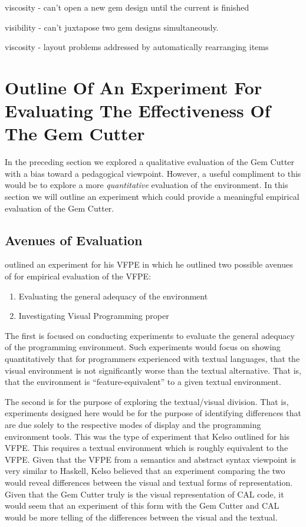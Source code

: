 viscosity - can't open a new gem design until the current is finished

visibility - can't juxtapose two gem designs simultaneously.

viscosity - layout problems addressed by automatically rearranging items

\section{Outline Of An Experiment For Evaluating The Effectiveness Of The Gem Cutter}

In the preceding section we explored a qualitative evaluation of the Gem Cutter with a bias toward a pedagogical viewpoint.  However, a useful compliment to this would be to explore a more \emph{quantitative} evaluation of the environment.  In this section we will outline an experiment which could provide a meaningful empirical evaluation of the Gem Cutter.

\subsection{Avenues of Evaluation}

\cite{Kelso02} outlined an experiment for his VFPE in which he outlined two possible avenues of for empirical evaluation of the VFPE:

\begin{enumerate}
	\item Evaluating the general adequacy of the environment
	\item Investigating Visual Programming proper
\end{enumerate}

The first is focused on conducting experiments to evaluate the general adequacy of the programming environment.  Such experiments would focus on showing quantitatively that for programmers experienced with textual languages, that the visual environment is not significantly worse than the textual alternative.  That is, that the environment is ``feature-equivalent'' to a given textual environment.

The second is for the purpose of exploring the textual/visual division.  That is, experiments designed here would be for the purpose of identifying differences that are due solely to the respective modes of display and the programming environment tools.  This was the type of experiment that Kelso outlined for his VFPE.  This requires a textual environment which is roughly equivalent to the VFPE.  
Given that the VFPE from a semantics and abstract syntax viewpoint is very similar to Haskell, Kelso believed that an experiment comparing the two would reveal differences between the visual and textual forms of representation.  Given that the Gem Cutter truly is the visual representation of CAL code, it would seem that an experiment of this form with the Gem Cutter and CAL would be more telling of the differences between the visual and the textual.

